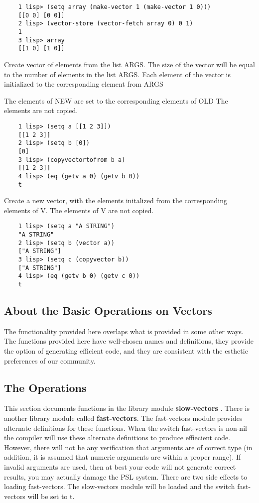 \begin{verbatim}
    1 lisp> (setq array (make-vector 1 (make-vector 1 0)))
    [[0 0] [0 0]]
    2 lisp> (vector-store (vector-fetch array 0) 0 1)
    1
    3 lisp> array
    [[1 0] [1 0]]
\end{verbatim}

{    Create vector of elements from the list ARGS.  The  size  of
    the  vector  will  be equal to the number of elements in the
    list ARGS.  Each element of the vector is initialized to the
    corresponding element from ARGS
}

{    The elements of NEW are set to the corresponding elements of
    OLD The elements are not copied.
}
\begin{verbatim}
    1 lisp> (setq a [[1 2 3]])
    [[1 2 3]]
    2 lisp> (setq b [0])
    [0]
    3 lisp> (copyvectortofrom b a)
    [[1 2 3]]
    4 lisp> (eq (getv a 0) (getv b 0))
    t
\end{verbatim}
{    Create a new vector, with the elements initalized  from  the
    corresponding  elements  of  V.    The elements of V are not
    copied.
}
\begin{verbatim}
    1 lisp> (setq a "A STRING")
    "A STRING"
    2 lisp> (setq b (vector a))
    ["A STRING"]
    3 lisp> (setq c (copyvector b))
    ["A STRING"]
    4 lisp> (eq (getv b 0) (getv c 0))
    t
\end{verbatim}
\subsection{About the Basic Operations on Vectors}

  The functionality provided here overlaps what is  provided  in
some  other  ways.  The functions provided here have well-chosen
names and definitions, they provide  the  option  of  generating
efficient  code,  and  they  are  consistent  with  the esthetic
preferences of our community.

\subsection{The Operations}

  This section documents functions in the library module {\bf slow-vectors}
. There is another library module called {\bf fast-vectors}. The 
fast-vectors module provides alternate definitions for these
functions. When the switch fast-vectors is non-nil the compiler will use
these alternate definitions to produce effiecient code. However, 
there will not be any verification that arguments are of correct type
(in addition, it is assumed that numeric arguments are within a proper 
range). If invalid arguments are used, then at best your code will not
generate correct results, you may actually damage the PSL system.    
There are two side effects to loading fast-vectors. The slow-vectors 
module will be loaded and the switch fast-vectors will be set 
to t.


